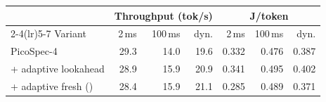 \begin{tabular}{@{}lrrrrrr@{}}
\toprule
 & \multicolumn{3}{c}{Throughput (tok/s)} & \multicolumn{3}{c}{J/token}\\
\cmidrule(lr){2-4}\cmidrule(lr){5-7}
Variant & 2\,ms & 100\,ms & dyn. & 2\,ms & 100\,ms & dyn.\\
\midrule
PicoSpec-4 & 29.3 & 14.0 & 19.6 & 0.332 & 0.476 & 0.387\\
+ adaptive lookahead & 28.9 & 15.9 & 20.9 & 0.341 & 0.495 & 0.402\\
+ adaptive fresh (\capes{}) & 28.4 & 15.9 & 21.1 & 0.285 & 0.489 & 0.371\\
\bottomrule
\end{tabular}
